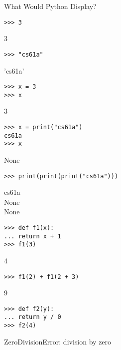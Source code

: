 \question What Would Python Display?

\begin{lstlisting}
>>> 3
\end{lstlisting}
\begin{solution}[.2in]
3
\end{solution}

\begin{lstlisting}
>>> "cs61a"
\end{lstlisting}
\begin{solution}[.2in]
'cs61a'
\end{solution}

\begin{lstlisting}
>>> x = 3
>>> x
\end{lstlisting}
\begin{solution}[.2in]
3
\end{solution}

\begin{lstlisting}
>>> x = print("cs61a")
cs61a
>>> x
\end{lstlisting}
\begin{solution}[.2in]
None
\end{solution}

\begin{lstlisting}
>>> print(print(print("cs61a")))
\end{lstlisting}
\begin{solution}[.6in]
cs61a \\
None \\
None
\end{solution}

\begin{lstlisting}
>>> def f1(x):
...	return x + 1
>>> f1(3)
\end{lstlisting}
\begin{solution}[.2in]
4
\end{solution}

\begin{lstlisting}
>>> f1(2) + f1(2 + 3)
\end{lstlisting}
\begin{solution}[.2in]
9
\end{solution}

\begin{lstlisting}
>>> def f2(y):
...	return y / 0
>>> f2(4)
\end{lstlisting}
\begin{solution}[.2in]
ZeroDivisionError: division by zero
\end{solution}

